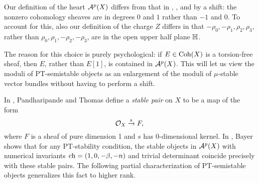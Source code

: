 \begin{rmk}
    Our definition of the heart $\mathcal{A}^p(X)$ differs from that in \cite{lo-PT1}, \cite{lo-PT2}, and \cite{bayer-polynomial} by a shift: the nonzero cohomology sheaves are in degrees $0$ and $1$ rather than $-1$ and $0$. To account for this, also our definition of the charge $Z$ differs in that $-\rho_0, -\rho_1, \rho_2, \rho_3$, rather than $\rho_0, \rho_1, -\rho_2, -\rho_3$, are in the open upper half plane $\mathbb{H}$.
    
    The reason for this choice is purely psychological: if $E \in \operatorname{\mathrm{Coh}}(X)$ is a torsion-free sheaf, then $E$, rather than $E[1]$, is contained in $\mathcal{A}^p(X)$. This will let us view the moduli of PT-semistable objects as an enlargement of the moduli of $\mu$-stable vector bundles without having to perform a shift.
\end{rmk} 

In \cite{PT}, Pandharipande and Thomas define a \emph{stable pair} on $X$ to be a map of the form
\[ \mathcal{O}_X \xrightarrow{s} F, \]
where $F$ is a sheaf of pure dimension 1 and $s$ has $0$-dimensional kernel. In \cite[Proposition 6.1.1]{bayer-polynomial}, Bayer shows that for any PT-stability condition, the stable objects in $\mathcal{A}^p(X)$ with numerical invariants $\operatorname{\mathrm{ch}} = (1, 0, -\beta, -n)$ and trivial determinant coincide precisely with these stable pairs. The following partial characterization of PT-semistable objects generalizes this fact to higher rank. 

